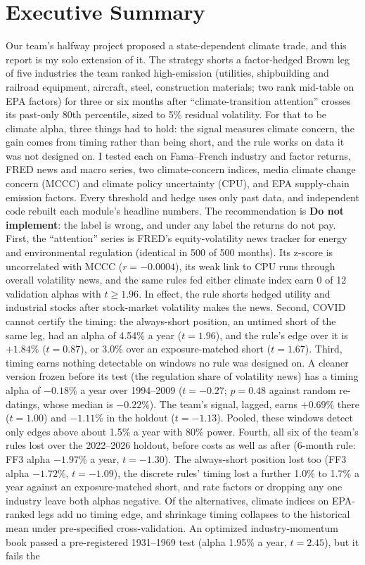 \section*{Executive Summary}
\label{sec:exec}
Our team's halfway project proposed a state-dependent climate trade, and this report is my solo extension of it. The strategy shorts a factor-hedged Brown leg of five industries the team ranked high-emission (utilities, shipbuilding and railroad equipment, aircraft, steel, construction materials; two rank mid-table on EPA factors) for three or six months after ``climate-transition attention'' crosses its past-only 80th percentile, sized to 5\% residual volatility. For that to be climate alpha, three things had to hold: the signal measures climate concern, the gain comes from timing rather than being short, and the rule works on data it was not designed on. I tested each on Fama--French industry and factor returns, FRED news and macro series, two climate-concern indices, media climate change concern (MCCC) and climate policy uncertainty (CPU), and EPA supply-chain emission factors. Every threshold and hedge uses only past data, and independent code rebuilt each module's headline numbers. The recommendation is \textbf{Do not implement}: the label is wrong, and under any label the returns do not pay. First, the ``attention'' series is FRED's equity-volatility news tracker for energy and environmental regulation (identical in 500 of 500 months). Its z-score is uncorrelated with MCCC ($r=-0.0004$), its weak link to CPU runs through overall volatility news, and the same rules fed either climate index earn 0 of 12 validation alphas with $t\ge1.96$. In effect, the rule shorts hedged utility and industrial stocks after stock-market volatility makes the news. Second, COVID cannot certify the timing: the always-short position, an untimed short of the same leg, had an alpha of 4.54\% a year ($t=1.96$), and the rule's edge over it is $+1.84$\% ($t=0.87$), or 3.0\% over an exposure-matched short ($t=1.67$). Third, timing earns nothing detectable on windows no rule was designed on. A cleaner version frozen before its test (the regulation share of volatility news) has a timing alpha of $-0.18$\% a year over 1994--2009 ($t=-0.27$; $p=0.48$ against random re-datings, whose median is $-0.22$\%). The team's signal, lagged, earns $+0.69$\% there ($t=1.00$) and $-1.11$\% in the holdout ($t=-1.13$). Pooled, these windows detect only edges above about 1.5\% a year with 80\% power. Fourth, all six of the team's rules lost over the 2022--2026 holdout, before costs as well as after (6-month rule: FF3 alpha $-1.97$\% a year, $t=-1.30$). The always-short position lost too (FF3 alpha $-1.72$\%, $t=-1.09$), the discrete rules' timing lost a further 1.0\% to 1.7\% a year against an exposure-matched short, and rate factors or dropping any one industry leave both alphas negative. Of the alternatives, climate indices on EPA-ranked legs add no timing edge, and shrinkage timing collapses to the historical mean under pre-specified cross-validation. An optimized industry-momentum book passed a pre-registered 1931--1969 test (alpha 1.95\% a year, $t=2.45$), but it fails the 